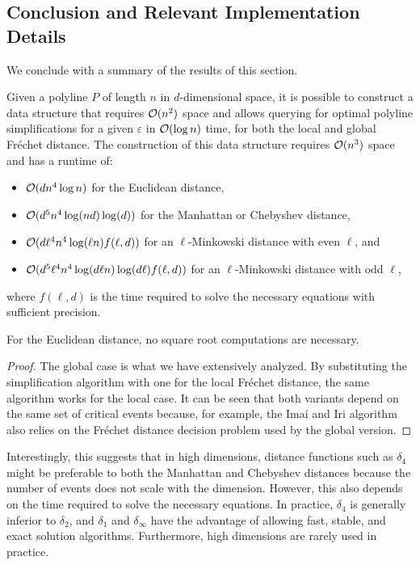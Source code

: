 \subsection{Conclusion and Relevant Implementation Details}
We conclude with a summary of the results of this section.
\begin{theorem}\label{thm:query-ds}
	Given a polyline \(P\) of length \(n\) in \(d\)-dimensional space, it is possible to construct a data structure that requires \(\mathcal{O}(n^2)\) space and allows querying for optimal polyline simplifications for a given \(\varepsilon\) in \(\mathcal{O}(\log n)\) time, for both the local and global Fréchet distance. The construction of this data structure requires \(\mathcal{O}(n^3)\) space and has a runtime of:
	\begin{itemize}
		\item \(\mathcal{O}(d n^4 \log n)\) for the Euclidean distance,
		\item \(\mathcal{O}(d^5 n^4 \log(nd)\log(d))\) for the Manhattan or Chebyshev distance,
		\item \(\mathcal{O}(d\ell^4 n^4 \log(\ell n)f(\ell, d))\) for an \(\ell\)-Minkowski distance with even \(\ell\), and
		\item \(\mathcal{O}(d^5\ell^4 n^4 \log(d \ell n)\log(d \ell)f(\ell, d))\) for an \(\ell\)-Minkowski distance with odd \(\ell\),
	\end{itemize}
	where \(f(\ell, d)\) is the time required to solve the necessary equations with sufficient precision.

	For the Euclidean distance, no square root computations are necessary.
\end{theorem}

\begin{proof}
  The global case is what we have extensively analyzed. By substituting the simplification algorithm with one for the local Fréchet distance, the same algorithm works for the local case. It can be seen that both variants depend on the same set of critical events because, for example, the Imai and Iri algorithm also relies on the Fréchet distance decision problem used by the global version.
\end{proof}

Interestingly, this suggests that in high dimensions, distance functions such as \(\delta_4\) might be preferable to both the Manhattan and Chebyshev distances because the number of events does not scale with the dimension. However, this also depends on the time required to solve the necessary equations. In practice, \(\delta_4\) is generally inferior to \(\delta_2\), and \(\delta_1\) and \(\delta_\infty\) have the advantage of allowing fast, stable, and exact solution algorithms. Furthermore, high dimensions are rarely used in practice.

